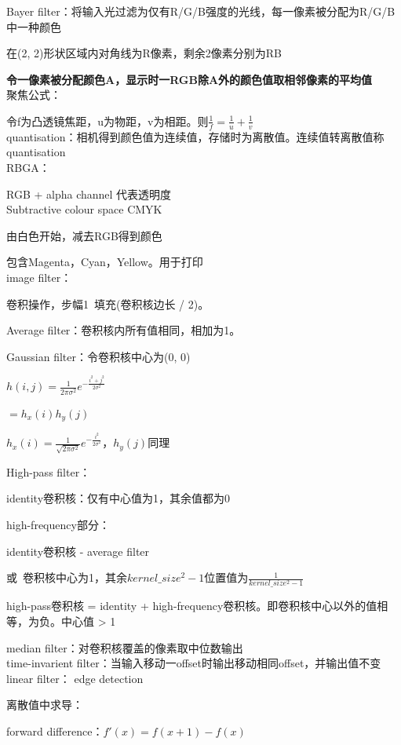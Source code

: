 \documentclass[UTF8]{ctexart}
\begin{document}
  Bayer filter：将输入光过滤为仅有R/G/B强度的光线，每一像素被分配为R/G/B中一种颜色

  \quad 在(2, 2)形状区域内对角线为R像素，剩余2像素分别为RB

  \textbf{令一像素被分配颜色A，显示时一RGB除A外的颜色值取相邻像素的平均值}\\
聚焦公式：

  令f为凸透镜焦距，u为物距，v为相距。则$\frac{1}{f} = \frac{1}{u} + \frac{1}{v}$\\
quantisation：相机得到颜色值为连续值，存储时为离散值。连续值转离散值称quantisation\\
RBGA：

  RGB + alpha channel 代表透明度\\
Subtractive colour space CMYK

  由白色开始，减去RGB得到颜色

  包含Magenta，Cyan，Yellow。用于打印\\
image filter：

  卷积操作，步幅1\ 填充(卷积核边长 / 2)。
  
  Average filter：卷积核内所有值相同，相加为1。

  Gaussian filter：令卷积核中心为(0, 0)

  \quad $h(i, j) = \frac{1}{2\pi\sigma^2}e^{-\frac{i^2+j^2}{2\sigma^2}}$

  \quad \quad $ = h_x(i) h_y(j)$

  \quad \quad $h_x(i) = \frac{1}{\sqrt{2\pi\sigma^2}}e^{-\frac{i^2}{2\sigma^2}}$，$h_y(j)$同理
  
  High-pass filter：

  \quad identity卷积核：仅有中心值为1，其余值都为0

  \quad high-frequency部分：
  
  \quad \quad identity卷积核 - average filter

  \quad \quad 或\ 卷积核中心为1，其余$kernel\_size^2 - 1$位置值为$\frac{1}{kernel\_size^2 - 1}$

  \quad high-pass卷积核 = identity + high-frequency卷积核。即卷积核中心以外的值相等，为负。中心值 > 1

  median filter：对卷积核覆盖的像素取中位数输出\\
time-invarient filter：当输入移动一offset时输出移动相同offset，并输出值不变\\
linear filter：
edge detection

  离散值中求导：
  
  \quad forward difference：$f'(x) = f(x + 1) - f(x)$
\end{document}
